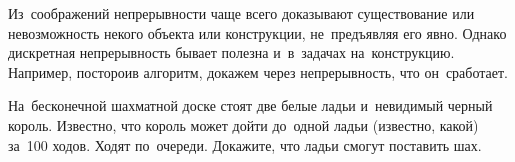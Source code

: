 Из~соображений непрерывности чаще всего доказывают существование или
невозможность некого объекта или конструкции, не~предъявляя его явно.
Однако дискретная непрерывность бывает полезна и~в~задачах на~конструкцию.
Например, постороив алгоритм, докажем через непрерывность, что он~сработает.

\begin{problems}

\item
На~бесконечной шахматной доске стоят две белые ладьи и~невидимый черный король.
Известно, что король может дойти до~одной ладьи (известно, какой) за~100 ходов.
Ходят по~очереди.
Докажите, что ладьи смогут поставить шах.

\end{problems}

